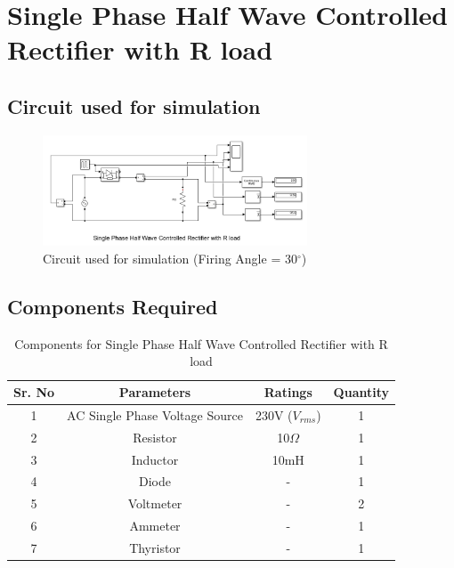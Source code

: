 \section{Single Phase Half Wave Controlled Rectifier with R load}

\subsection{Circuit used for simulation}

\begin{figure}[h]
    \centering
    \includegraphics[width=0.7\textwidth]{images/experiment-1/circuit-diagram-simulation-05.png}
    \caption{Circuit used for simulation (Firing Angle = 30$ ^\circ $)}
    \label{Fig_simulation_circuit_single-phase-half-wave-controlled-rectifier-with-R-load}
\end{figure}

\subsection{Components Required}

\begin{table}[h]
    \renewcommand{\arraystretch}{1.3}
    \label{table_components_required_circuit_5}
    \centering
    \begin{tabular}{|c|c|c|c|}
        \hline
        Sr. No & Parameters                     & Ratings            & Quantity \\
        \hline
        \hline
        1      & AC Single Phase Voltage Source & 230V ($ V_{rms} $) & 1        \\
        \hline
        2      & Resistor                       & 10$ \Omega $       & 1        \\
        \hline
        3      & Inductor                       & 10mH               & 1        \\
        \hline
        4      & Diode                          & -                  & 1        \\
        \hline
        5      & Voltmeter                      & -                  & 2        \\
        \hline
        6      & Ammeter                        & -                  & 1        \\
        \hline
        7      & Thyristor                      & -                  & 1        \\
        \hline
    \end{tabular}
    \caption{Components for Single Phase Half Wave Controlled Rectifier with R load}

\end{table}



